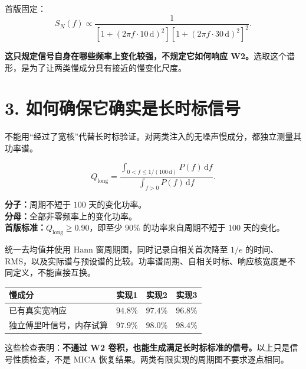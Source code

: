 \documentclass[11pt,a4paper]{article}
\newcommand{\dd}{\,\mathrm{d}}
\begin{document}
{\zhfont 首版固定：}
\begin{equation}
S_N(f)\propto
\frac{1}{
\left[1+\left(2\pi f\cdot10\,\mathrm{d}\right)^2\right]
\left[1+\left(2\pi f\cdot30\,\mathrm{d}\right)^2\right]^2
}.
\end{equation}

\textbf{{\zhfont 这只规定信号自身在哪些频率上变化较强，不规定它如何响应} W2{\zhfont 。}}{\zhfont 选取这个谱形，是为了让两类慢成分具有接近的慢变化尺度。}

\newpage
\section*{3. {\zhfont 如何确保它确实是长时标信号}}

{\zhfont 不能用}“{\zhfont 经过了宽核}”{\zhfont 代替长时标验证。对两类注入的无噪声慢成分，都独立测量其功率谱。}

\begin{equation}
Q_{\mathrm{long}}=
\frac{\displaystyle\int_{0<f\le1/(100\,\mathrm{d})}P(f)\dd f}
{\displaystyle\int_{f>0}P(f)\dd f}.
\end{equation}

\textbf{{\zhfont 分子：}}{\zhfont 周期不短于} $100$ {\zhfont 天的变化功率。}\\
\textbf{{\zhfont 分母：}}{\zhfont 全部非零频率上的变化功率。}\\
\textbf{{\zhfont 首版标准：}}$Q_{\mathrm{long}}\ge0.90${\zhfont ，即至少} $90\%$ {\zhfont 的功率来自周期不短于} $100$ {\zhfont 天的变化。}

{\zhfont 统一去均值并使用} Hann {\zhfont 窗周期图，同时记录自相关首次降至} $1/e$ {\zhfont 的时间、}RMS{\zhfont ，以及实际谱与预设谱的比较。功率谱周期、自相关时标、响应核宽度是不同定义，不能直接互换。}

\begin{center}
\begin{tabular}{@{}lccc@{}}
\toprule
{\zhfont 慢成分} & {\zhfont 实现}1 & {\zhfont 实现}2 & {\zhfont 实现}3\\
\midrule
{\zhfont 已有真实宽响应} & $94.8\%$ & $97.4\%$ & $96.8\%$\\
{\zhfont 独立傅里叶信号，内存试算} & $97.9\%$ & $98.0\%$ & $98.4\%$\\
\bottomrule
\end{tabular}
\end{center}

{\zhfont 这些检查表明：}\textbf{{\zhfont 不通过} W2 {\zhfont 卷积，也能生成满足长时标标准的信号。}}{\zhfont 以上只是信号性质检查，不是} MICA {\zhfont 恢复结果。两类有限实现的周期图不要求逐点相同。}
\end{document}
